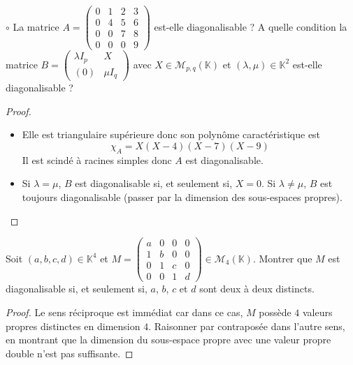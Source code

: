 \documentclass[french,a4paper]{article}
\newcommand{\K}{\mathbb{K}}
\theoremstyle{plain}
\theoremstyle{definition}
\theoremstyle{remark}
\begin{document}
\begin{ex}{$\circ$}
	La matrice $A=\displaystyle\begin{pmatrix}
		0&1&2&3\\
		0&4&5&6\\
		0&0&7&8\\
		0&0&0&9
	\end{pmatrix}$ est-elle diagonalisable ? A quelle condition la matrice $B=\displaystyle\begin{pmatrix}
		\lambda I_p&X\\
		(0)&\mu I_q
	\end{pmatrix}$ avec $X\in\mathcal{M}_{p,q}(\K)$ et $(\lambda,\mu)\in\K^2$ est-elle diagonalisable ?
\end{ex}
\begin{proof}
	\begin{itemize}
		\item Elle est triangulaire supérieure donc son polynôme caractéristique est $$\chi_A=X(X-4)(X-7)(X-9)$$ Il est scindé à racines simples donc $A$ est diagonalisable.
		\item Si $\lambda=\mu$, $B$ est diagonalisable si, et seulement si, $X=0$. Si $\lambda\ne \mu$, $B$ est toujours diagonalisable (passer par la dimension des sous-espaces propres).
	\end{itemize}
\end{proof}

\begin{ex}{}
	Soit $(a,b,c,d)\in\K^4$ et $M=\displaystyle\begin{pmatrix}
		a&0&0&0\\
		1&b&0&0\\
		0&1&c&0\\
		0&0&1&d
	\end{pmatrix}\in\mathcal{M}_4(\K)$. Montrer que $M$ est diagonalisable si, et seulement si, $a$, $b$, $c$ et $d$ sont deux à deux distincts.
\end{ex}
\begin{proof}
	Le sens réciproque est immédiat car dans ce cas, $M$ possède $4$ valeurs propres distinctes en dimension $4$. Raisonner par contraposée dans l'autre sens, en montrant que la dimension du sous-espace propre avec une valeur propre double n'est pas suffisante.
\end{proof}
\end{document}
